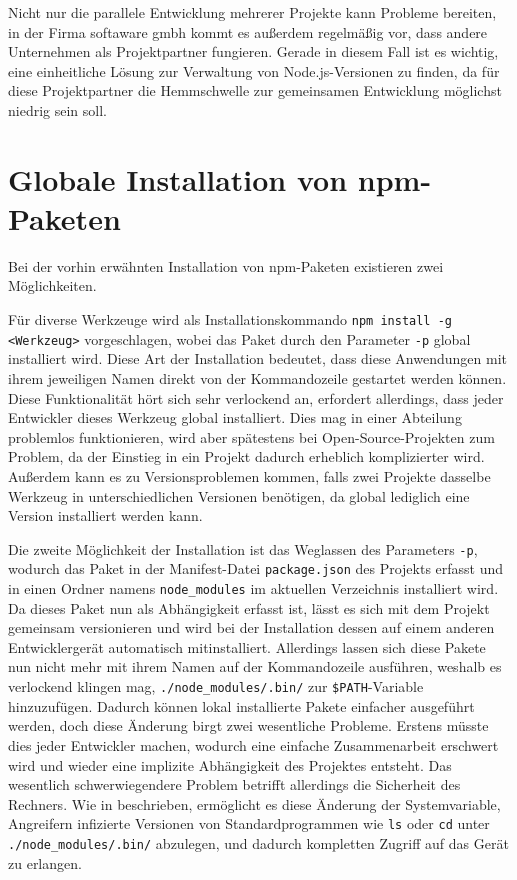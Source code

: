 Nicht nur die parallele Entwicklung mehrerer Projekte kann Probleme bereiten, in der Firma softaware gmbh kommt es außerdem regelmäßig vor, dass andere Unternehmen als Projektpartner fungieren.
Gerade in diesem Fall ist es wichtig, eine einheitliche Lösung zur Verwaltung von Node.js-Versionen zu finden, da für diese Projektpartner die Hemmschwelle zur gemeinsamen Entwicklung möglichst niedrig sein soll.


\section{Globale Installation von npm-Paketen}
\label{sec:global-package-installation}
Bei der vorhin erwähnten Installation von npm-Paketen existieren zwei Möglichkeiten.

Für diverse Werkzeuge wird als Installationskommando \verb|npm install -g <Werkzeug>| vorgeschlagen, wobei das Paket durch den Parameter \verb|-p| global installiert wird.
Diese Art der Installation bedeutet, dass diese Anwendungen mit ihrem jeweiligen Namen direkt von der Kommandozeile gestartet werden können.
Diese Funktionalität hört sich sehr verlockend an, erfordert allerdings, dass jeder Entwickler dieses Werkzeug global installiert.
Dies mag in einer Abteilung problemlos funktionieren, wird aber spätestens bei Open-Source-Projekten zum Problem, da der Einstieg in ein Projekt dadurch erheblich komplizierter wird.
Außerdem kann es zu Versionsproblemen kommen, falls zwei Projekte dasselbe Werkzeug in unterschiedlichen Versionen benötigen, da global lediglich eine Version installiert werden kann.

Die zweite Möglichkeit der Installation ist das Weglassen des Parameters \verb|-p|, wodurch das Paket in der Manifest-Datei \verb|package.json| des Projekts erfasst und in einen Ordner namens \verb|node_modules| im aktuellen Verzeichnis installiert wird.
Da dieses Paket nun als Abhängigkeit erfasst ist, lässt es sich mit dem Projekt gemeinsam versionieren und wird bei der Installation dessen auf einem anderen Entwicklergerät automatisch mitinstalliert.
Allerdings lassen sich diese Pakete nun nicht mehr mit ihrem Namen auf der Kommandozeile ausführen, weshalb es verlockend klingen mag, \verb|./node_modules/.bin/| zur \verb|$PATH|-Variable hinzuzufügen.
Dadurch können lokal installierte Pakete einfacher ausgeführt werden, doch diese Änderung birgt zwei wesentliche Probleme.
Erstens müsste dies jeder Entwickler machen, wodurch eine einfache Zusammenarbeit erschwert wird und wieder eine implizite Abhängigkeit des Projektes entsteht.
Das wesentlich schwerwiegendere Problem betrifft allerdings die Sicherheit des Rechners.
Wie in \autocite{stackoverflow:nodemodules-hack:online} beschrieben, ermöglicht es diese Änderung der Systemvariable, Angreifern infizierte Versionen von Standardprogrammen wie \verb|ls| oder \verb|cd| unter \verb|./node_modules/.bin/| abzulegen, und dadurch kompletten Zugriff auf das Gerät zu erlangen.

